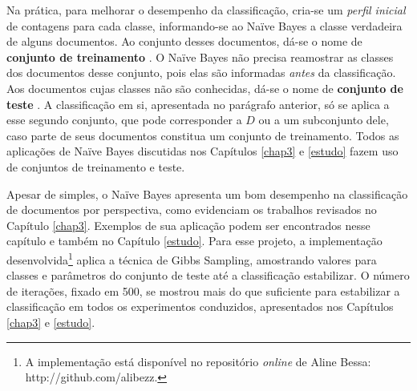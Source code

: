 Na prática, para melhorar o desempenho da classificação, cria-se um \emph{perfil inicial} de contagens para cada classe, informando-se ao Naïve Bayes a classe verdadeira de alguns documentos. Ao conjunto desses documentos, dá-se o nome de \textbf{conjunto de treinamento} \cite{bishop}. O Naïve Bayes não precisa reamostrar as classes dos documentos desse conjunto, pois elas são informadas \emph{antes} da classificação. Aos documentos cujas classes não são conhecidas, dá-se o nome de \textbf{conjunto de teste} \cite{bishop}. A classificação em si, apresentada no parágrafo anterior, só se aplica a esse segundo conjunto, que pode corresponder a \ensuremath{D} ou a um subconjunto dele, caso parte de seus documentos constitua um conjunto de treinamento. Todos as aplicações de Naïve Bayes discutidas nos Capítulos \ref{chap3} e \ref{estudo} fazem uso de conjuntos de treinamento e teste.

Apesar de simples, o Naïve Bayes apresenta um bom desempenho na classificação de documentos por perspectiva, como evidenciam os trabalhos revisados no Capítulo \ref{chap3}. Exemplos de sua aplicação podem ser encontrados nesse capítulo e também no Capítulo \ref{estudo}. Para esse projeto, a implementação desenvolvida\footnote{A implementação está disponível no repositório \emph{online} de Aline Bessa: http://github.com/alibezz.} aplica a técnica de Gibbs Sampling, amostrando valores para classes e parâmetros do conjunto de teste até a classificação estabilizar. O número de iterações, fixado em 500, se mostrou mais do que suficiente para estabilizar a classificação em todos os experimentos conduzidos, apresentados nos Capítulos \ref{chap3} e \ref{estudo}. 


